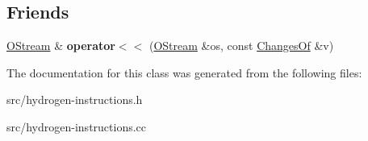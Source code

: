 \subsection*{Friends}
\begin{DoxyCompactItemize}
\item 
\hypertarget{classv8_1_1internal_1_1_h_value_a3f3f16a9c379f98e04d6216d7ff9da1a}{}\hyperlink{classv8_1_1internal_1_1_o_stream}{O\+Stream} \& {\bfseries operator$<$$<$} (\hyperlink{classv8_1_1internal_1_1_o_stream}{O\+Stream} \&os, const \hyperlink{structv8_1_1internal_1_1_changes_of}{Changes\+Of} \&v)\label{classv8_1_1internal_1_1_h_value_a3f3f16a9c379f98e04d6216d7ff9da1a}

\end{DoxyCompactItemize}


The documentation for this class was generated from the following files\+:\begin{DoxyCompactItemize}
\item 
src/hydrogen-\/instructions.\+h\item 
src/hydrogen-\/instructions.\+cc\end{DoxyCompactItemize}
